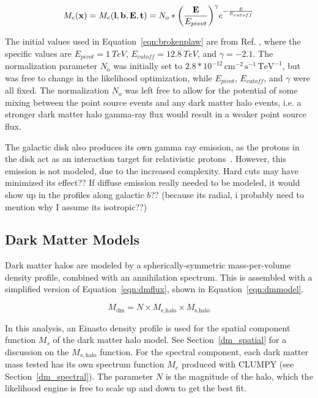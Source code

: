   \begin{equation}\label{eqn:brokenplaw}
    M_e(\mathbf{x }) = M_e(\mathbf{l },\mathbf{b },\mathbf{E },\mathbf{t }) = N_o * { \left ( \frac{\mathbf{E }}{E_{pivot}} \right ) }^{\gamma} {e}^{-\frac{E}{E_{cutoff}}}
  \end{equation}
  
  The initial values used in Equation~\ref{eqn:brokenplaw} are from Ref. \cite{VeritasGCRidge2015}, where the specific values are $E_{pivot}=\SI{1}{TeV}$, $E_{cutoff}=\SI{12.8}{TeV}$, and $\gamma=-2.1$.
  The normalization parameter $N_o$ was initially set to $2.8*{10}^{-12}\,\text{cm}^{-2}\,\text{s}^{-1}\,\text{TeV}^{-1}$, but was free to change in the likelihood optimization, while $E_{pivot}$, $E_{cutoff}$, and $\gamma$ were all fixed.
  The normalization $N_o$ was left free to allow for the potential of some mixing between the point source events and any dark matter halo events, i.e. a stronger dark matter halo gamma-ray flux would result in a weaker point source flux.
  
  The galactic disk also produces its own gamma ray emission, as the protons in the disk act as an interaction target for relativistic protons~\cite{tevgev_gc_diffuse}.
  However, this emission is not modeled, due to the increased complexity.
  {\color{red}
  Hard cuts may have minimized its effect??
  If diffuse emission really needed to be modeled, it would show up in the profiles along galactic $b$??
  (because its radial, i probably need to mention why I assume its isotropic??)
  }
  
  \subsection{Dark Matter Models}\label{subsec:dmhalomodel}
  Dark matter halos are modeled by a spherically-symmetric mass-per-volume density profile, combined with an annihilation spectrum.
  This is assembled with a simplified version of Equation~\ref{eqn:dmflux}, shown in Equation~\ref{eqn:dmmodel}.
  
  \begin{equation}\label{eqn:dmmodel}
    M_{\textrm{dm}} = N \times M_{\textrm{e,halo}} \times M_{\textrm{s,halo}}
  \end{equation}
  
  In this analysis, an Einasto density profile is used for the spatial component function $M_s$ of the dark matter halo model.
  See Section~\ref{dm_spatial} for a discussion on the $M_{s,\textrm{halo}}$ function.
  For the spectral component, each dark matter mass tested has its own spectrum function $M_e$ produced with CLUMPY (see Section~\ref{dm_spectral}).
  The parameter $N$ is the magnitude of the halo, which the likelihood engine is free to scale up and down to get the best fit.

